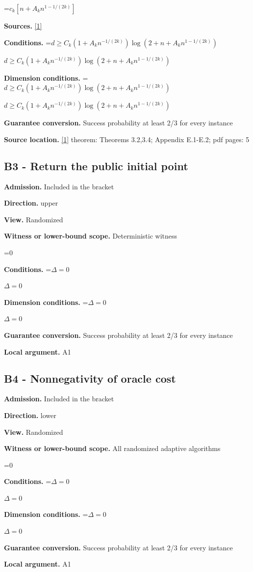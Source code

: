 \documentclass[10pt,a4paper]{article}
\newcommand{\AtlasMath}[1]{\par\begingroup\centering\setbox0=\hbox{$\displaystyle #1$}\ifdim\wd0>1.4\linewidth\typeout{ATLAS WIDE FORMULA: \the\wd0}\fi\ifdim\wd0>\linewidth\resizebox{\linewidth}{!}{\box0}\else\box0\fi\par\endgroup}
\newcommand{\AtlasInlineMath}[1]{\begingroup\setbox0=\hbox{$#1$}\ifdim\wd0>.4\linewidth\endgroup\AtlasMath{#1}\else\endgroup$#1$\fi}
\begin{document}
\AtlasMath{c_k[n+A_kn^{1-1/(2k)}]}
\textbf{Sources.} \href{https://arxiv.org/pdf/2609.28202v2}{[1]}

\textbf{Conditions.} \AtlasInlineMath{d\ge C_k(1+A_kn^{-1/(2k)})\log(2+n+A_kn^{1-1/(2k)})}

\textbf{Dimension conditions.} \AtlasInlineMath{d\ge C_k(1+A_kn^{-1/(2k)})\log(2+n+A_kn^{1-1/(2k)})}

\textbf{Guarantee conversion.} Success probability at least 2/3 for every instance

\textbf{Source location.} \href{https://arxiv.org/pdf/2609.28202v2}{[1]} theorem: Theorems 3.2,3.4; Appendix E.1-E.2; pdf pages: 5

\subsection{B3 - Return the public initial point}
\textbf{Admission.} Included in the bracket

\textbf{Direction.} upper

\textbf{View.} Randomized

\textbf{Witness or lower-bound scope.} Deterministic witness

\AtlasMath{0}
\textbf{Conditions.} \AtlasInlineMath{\Delta=0}

\textbf{Dimension conditions.} \AtlasInlineMath{\Delta=0}

\textbf{Guarantee conversion.} Success probability at least 2/3 for every instance

\textbf{Local argument.} A1

\subsection{B4 - Nonnegativity of oracle cost}
\textbf{Admission.} Included in the bracket

\textbf{Direction.} lower

\textbf{View.} Randomized

\textbf{Witness or lower-bound scope.} All randomized adaptive algorithms

\AtlasMath{0}
\textbf{Conditions.} \AtlasInlineMath{\Delta=0}

\textbf{Dimension conditions.} \AtlasInlineMath{\Delta=0}

\textbf{Guarantee conversion.} Success probability at least 2/3 for every instance

\textbf{Local argument.} A1
\end{document}
